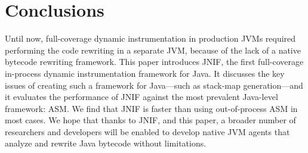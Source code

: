 \section{Conclusions}
\label{sec:jnif-conclusions}

Until now, full-coverage dynamic instrumentation in production JVMs required performing the code rewriting in a separate JVM, 
because of the lack of a native bytecode rewriting framework.
This paper introduces JNIF, the first full-coverage in-process dynamic instrumentation framework for Java.
It discusses the key issues of creating such a framework for Java---such as stack-map generation---and
it evaluates the performance of JNIF against the most prevalent Java-level framework: ASM.
We find that JNIF is faster than using out-of-process ASM in most cases.
We hope that thanks to JNIF, and this paper, a broader number of researchers and developers will
be enabled to develop native JVM agents that analyze and rewrite Java bytecode without limitations. 